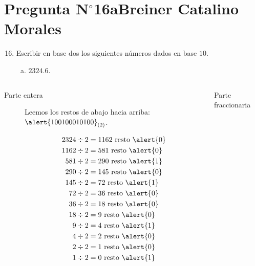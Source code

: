 \section{Pregunta N$^{\circ}$16a\qquad Breiner Catalino Morales}

\begin{frame}
	\begin{enumerate}\setcounter{enumi}{15}
		\item

		      Escribir en base dos los siguientes números dados en
		      base $10$.

		      \begin{enumerate}[a)]
			      \item

			            \begin{math}
				            2324.6
			            \end{math}.
		      \end{enumerate}
	\end{enumerate}

	\begin{solution}
		\begin{columns}[t]
			\begin{column}{0.48\textwidth}
				\begin{description}
					\item[Parte entera]
						Leemos los restos de abajo hacia arriba:
						${\alert{100100010100}}_{\left(2\right)}$.

						\begin{align*}
							2324 \div 2 & = 1162 \text{ resto }\alert{0} \\
							1162 \div 2 & = 581 \text{ resto }\alert{0}  \\
							581 \div 2  & = 290 \text{ resto }\alert{1}  \\
							290 \div 2  & = 145 \text{ resto }\alert{0}  \\
							145 \div 2  & = 72 \text{ resto }\alert{1}   \\
							72 \div 2   & = 36 \text{ resto }\alert{0}   \\
							36 \div 2   & = 18 \text{ resto }\alert{0}   \\
							18 \div 2   & = 9 \text{ resto }\alert{0}    \\
							9 \div 2    & = 4 \text{ resto }\alert{1}    \\
							4 \div 2    & = 2 \text{ resto }\alert{0}    \\
							2 \div 2    & = 1 \text{ resto }\alert{0}    \\
							1 \div 2    & = 0 \text{ resto }\alert{1}    \\
						\end{align*}
				\end{description}
			\end{column}
			\begin{column}{0.48\textwidth}
				\begin{description}
					\item[Parte fraccionaria]


\end{description}
\end{column}
\end{columns}
\end{solution}
\end{frame}
